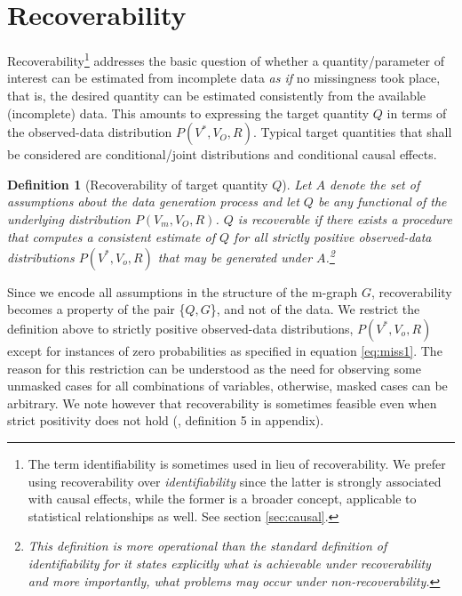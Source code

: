 \documentclass[12pt]{article}
\newtheorem{definition}{Definition}
\begin{document}
\section{Recoverability}
\label{sec:recoverability}
Recoverability\footnote{The term identifiability is sometimes used in lieu of recoverability. We prefer using recoverability over \textit{identifiability} since the latter is strongly associated with
causal effects, while the former is a broader concept, applicable
to statistical relationships as well. See section \ref{sec:causal}. } addresses the basic question of whether a quantity/parameter of interest can be estimated from incomplete data \textit{as if} no missingness took place, that is, the desired quantity can be estimated consistently from the available (incomplete) data. This amounts to expressing the target quantity $Q$ in terms of the observed-data distribution $P(V^*,V_O,R)$.  Typical target quantities that shall be considered are
conditional/joint distributions and conditional causal effects.
\begin{definition}[Recoverability of target quantity $Q$]  Let $A$ denote the set of assumptions about the data generation process and let $Q$ be any functional of the underlying distribution $P(V_m,V_O,R)$. $Q$ is recoverable if there exists a procedure that computes a  consistent estimate of $Q$ for all strictly positive  observed-data distributions $P(V^*,V_o,R)$ that may be generated under $A$.\footnote{This definition is more operational than the standard definition of identifiability for it states explicitly what is achievable under recoverability and more importantly, what problems may occur under non-recoverability. } 
\end{definition}
Since we encode all assumptions in the structure of the m-graph
$G$, recoverability becomes a property of the pair \{$Q, G$\}, and not of the data.
We restrict the definition above to strictly positive observed-data distributions, $P(V^*,V_o,R)$ except for  instances of zero probabilities as specified in equation \ref{eq:miss1}.  The reason for this restriction  can be understood as the need for observing some unmasked cases for all combinations of variables, otherwise, masked cases can be arbitrary.
We note however that recoverability is sometimes feasible even when strict positivity does not hold (\cite{mohan2013}, definition 5 in appendix).
\end{document}
